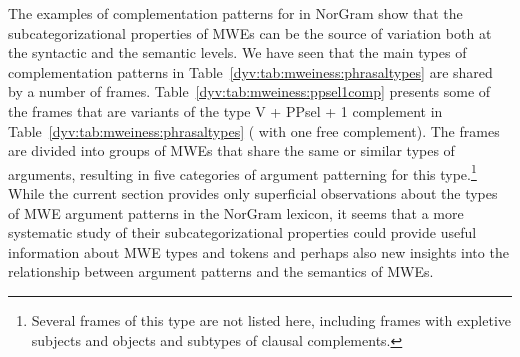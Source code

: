 \documentclass[output=paper]{langsci/langscibook}
\begin{document}
The examples of complementation patterns for  in NorGram show that the subcategorizational properties of MWEs can be the source of variation both at the syntactic and the semantic levels. 
We have seen that the main types of complementation patterns in Table~\ref{dyv:tab:mweiness:phrasaltypes} are shared by a number of  frames. %
Table~\ref{dyv:tab:mweiness:ppsel1comp} presents some of the frames that are variants of the type V + PPsel + 1 complement in Table~\ref{dyv:tab:mweiness:phrasaltypes} ( with one free complement). 
The frames are divided into groups of MWEs that share the same or similar types of arguments, resulting in five categories of argument patterning for this type.\footnote{Several frames of this type are not listed here, including frames with expletive subjects and objects and subtypes of clausal complements.} 
While the current section provides only superficial observations about the types of MWE argument patterns in the NorGram lexicon, it seems that a more systematic study of their subcategorizational properties could provide useful information about MWE types and tokens and perhaps also new insights into the relationship between argument patterns and the semantics of MWEs.
 
\end{document}
